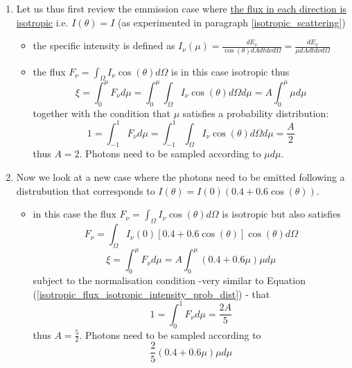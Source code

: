 \documentclass[../main/main.tex]{subfiles}
\begin{document}
\begin{enumerate}
\item Let us thus first review the emmission case where \underline{the flux in each direction is isotropic} i.e. $I(\theta) = I$ (as experimented in paragraph \ref{isotropic_scattering})
\begin{itemize}
\item the specific intensity is defined as $I_{\nu}(\mu) = \frac{dE_{\nu}}{\cos(\theta) dA dt d\nu d\Omega} = \frac{dE_{\nu}}{\mu dA dt d\nu d\Omega}$ 
\item the flux $F_{\nu} = \int_{\Omega} I_{\nu} \cos(\theta) d\Omega$ is in this case isotropic thus
\begin{equation}
\xi = \int_0^{\mu} F_{\nu} d\mu = \int_0^{\mu} \int_{\Omega} I_{\nu} \cos(\theta) d\Omega d\mu = A \int_0^{\mu} \mu d\mu   
\end{equation}
together with the condition that $\mu$ satisfies a probability distribution: 
\begin{equation}
1 = \int_{-1}^{1} F_{\nu} d\mu = \int_{-1}^{1} \int_{\Omega} I_{\nu} \cos(\theta) d\Omega d\mu = \frac{A}{2}
\label{isotropic_flux_isotropic_intensity_prob_dist}
\end{equation}
thus $A=2$. Photons need to be sampled according to $\mu d\mu$.
\end{itemize}

\item Now we look at a new case where the photons need to be emitted following a distrubution that corresponds to $I(\theta) = I(0)(0.4+0.6\cos(\theta))$. 
\begin{itemize}
\item in this case the flux $F_{\nu} = \int_{\Omega} I_{\nu} \cos(\theta) d\Omega$ is isotropic but also satisfies
\begin{equation}
F_{\nu} = \int_{\Omega} I_{\nu}(0)[0.4+0.6\cos(\theta)] \cos(\theta) d\Omega
\end{equation} 
\noindent{}
\begin{equation}
\xi = \int_0^{\mu} F_{\nu} d\mu = A \int_0^{\mu} (0.4+0.6\mu) \mu d\mu   
\end{equation}
subject to the normalisation condition -very similar to Equation (\ref{isotropic_flux_isotropic_intensity_prob_dist}) - that
\begin{equation}
1 = \int_{0}^{1} F_{\nu} d\mu = \frac{2A}{5}
\end{equation}
thus $A = \frac{5}{2}$. Photons need to be sampled according to
\begin{equation}
\frac{2}{5}(0.4+0.6\mu)\mu d\mu
\label{prob_dist_Eddington}
\end{equation}
\end{itemize}


\end{enumerate}
\end{document}
